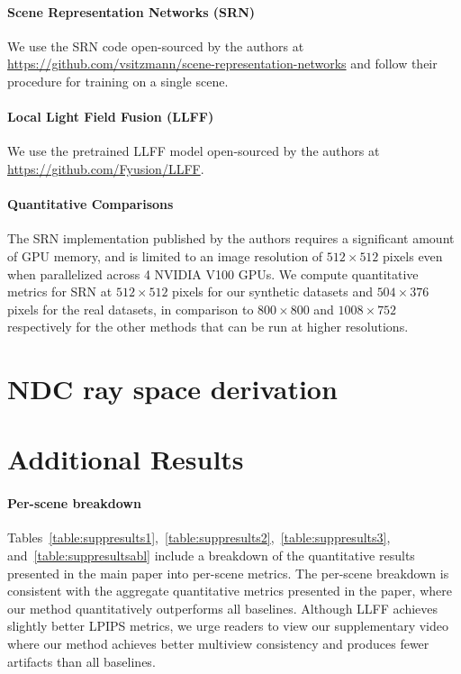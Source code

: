 \documentclass[runningheads]{llncs}
\begin{document}
\paragraph{\textbf{Scene Representation Networks (SRN)}~\cite{srn}}
We use the SRN code open-sourced by the authors at \url{https://github.com/vsitzmann/scene-representation-networks} and follow their procedure for training on a single scene.

\paragraph{\textbf{Local Light Field Fusion (LLFF)}~\cite{mildenhall19}}
We use the pretrained LLFF model open-sourced by the authors at \url{https://github.com/Fyusion/LLFF}.

\paragraph{\textbf{Quantitative Comparisons}} The SRN implementation published by the authors requires a significant amount of GPU memory, and is limited to an image resolution of $512 \times 512$ pixels even when parallelized across 4 NVIDIA V100 GPUs. We compute quantitative metrics for SRN at $512 \times 512$ pixels for our synthetic datasets and $504 \times 376$ pixels for the real datasets, in comparison to $800\times 800$ and $1008 \times 752$ respectively for the other methods that can be run at higher resolutions.


\section{NDC ray space derivation}



\section{Additional Results}

\paragraph{\textbf{Per-scene breakdown}}
Tables~\ref{table:suppresults1},~\ref{table:suppresults2},~\ref{table:suppresults3}, and~\ref{table:suppresultsabl} include a breakdown of the quantitative results presented in the main paper into per-scene metrics. The per-scene breakdown is consistent with the aggregate quantitative metrics presented in the paper, where our method quantitatively outperforms all baselines. Although LLFF achieves slightly better LPIPS metrics, we urge readers to view our supplementary video where our method achieves better multiview consistency and produces fewer artifacts than all baselines. 





\end{document}
